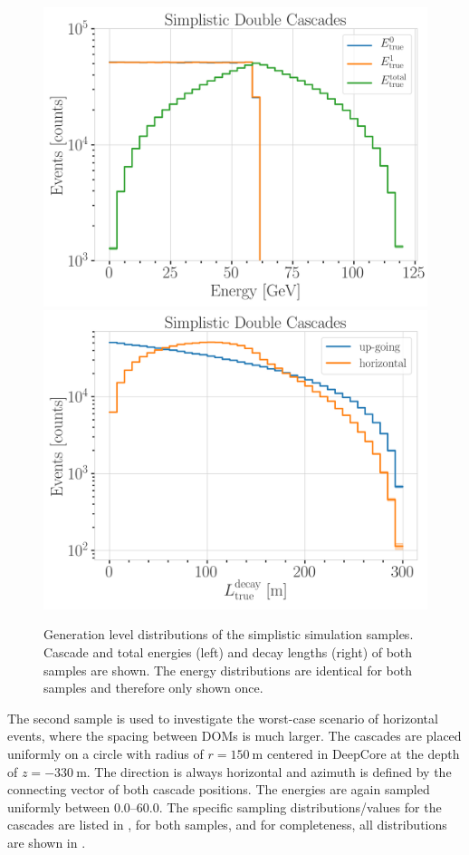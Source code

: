 \begin{figure}[h]
    \centering
    \includegraphics[width=.49\linewidth]{figures/model_independent_simulation/gen_level/simplistic_1_d_distr_all_energies.png}
    \includegraphics[width=.49\linewidth]{figures/model_independent_simulation/gen_level/simplistic_1_d_distr_true_decay_length.png}
    \caption[Simplified model-independent simulation generation level distributions]{Generation level distributions of the simplistic simulation samples. Cascade and total energies (left) and decay lengths (right) of both samples are shown. The energy distributions are identical for both samples and therefore only shown once.}
\end{figure}

The second sample is used to investigate the worst-case scenario of horizontal events, where the spacing between DOMs is much larger. The cascades are placed uniformly on a circle with radius of $r=\SI{150}{\meter}$ centered in DeepCore at the depth of $z=\SI{-330}{\meter}$. The direction is always horizontal and azimuth is defined by the connecting vector of both cascade positions. The energies are again sampled uniformly between \SIrange[range-phrase={~and~}]{0.0}{60.0}{\gev}. The specific sampling distributions/values for the cascades are listed in , for both samples, and for completeness, all distributions are shown in .

